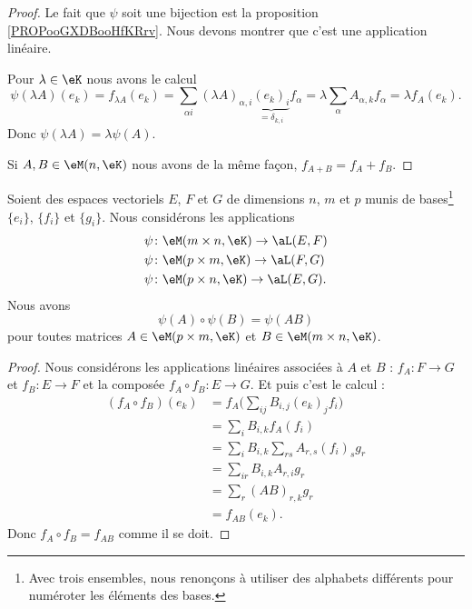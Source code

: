 \begin{proof}
	Le fait que \( \psi\) soit une bijection est la proposition \ref{PROPooGXDBooHfKRrv}. Nous devons montrer que c'est une application linéaire.

	Pour \( \lambda\in \eK\) nous avons le calcul
	\begin{equation}
		\psi(\lambda A)(e_k)=f_{\lambda A}(e_k)=\sum_{\alpha i}(\lambda A)_{\alpha, i}\underbrace{(e_k)_i}_{=\delta_{k,i}}f_{\alpha}=\lambda\sum_{\alpha}A_{\alpha, k}f_{\alpha}=\lambda f_A(e_k).
	\end{equation}
	Donc \( \psi(\lambda A)=\lambda\psi(A)\).

	Si \( A,B\in \eM(n,\eK)\) nous avons de la même façon, \( f_{A+B}=f_A+f_B\).
\end{proof}

\begin{proposition}     \label{PROPooCSJNooEqcmFm}
	Soient des espaces vectoriels \( E\), \( F\) et \( G\) de dimensions \( n\), \( m\) et \( p\) munis de bases\footnote{Avec trois ensembles, nous renonçons à utiliser des alphabets différents pour numéroter les éléments des bases.} \( \{ e_i \}\), \( \{ f_i \}\) et \( \{ g_i \}\). Nous considérons les applications
	\begin{subequations}
		\begin{align}
			\psi & \colon \eM(m\times n,\eK)\to \aL(E,F)  \\
			\psi & \colon \eM(p\times m,\eK)\to \aL(F,G)  \\
			\psi & \colon \eM(p\times n,\eK)\to \aL(E,G).
		\end{align}
	\end{subequations}
	Nous avons
	\begin{equation}
		\psi(A)\circ \psi(B)=\psi(AB)
	\end{equation}
	pour toutes matrices \( A\in \eM(p\times m,\eK)\) et \( B\in \eM(m\times n,\eK)\).
\end{proposition}

\begin{proof}
	Nous considérons les applications linéaires associées à \( A\) et \( B\) : \( f_A\colon F\to G\) et \( f_B\colon E\to F\) et la composée \( f_A\circ f_B\colon E\to G\). Et puis c'est le calcul :
	\begin{subequations}
		\begin{align}
			(f_A\circ f_B)(e_k) & =f_A\big( \sum_{ij}B_{i,j}(e_k)_j f_i \big) \\
			                    & =\sum_i B_{i,k}f_A(f_i)                     \\
			                    & =\sum_iB_{i,k}\sum_{rs}A_{r,s}(f_i)_s g_r   \\
			                    & =\sum_{ir}B_{i,k}A_{r,i} g_r                \\
			                    & =\sum_r(AB)_{r,k} g_r                       \\
			                    & =f_{AB}(e_k).
		\end{align}
	\end{subequations}
	Donc \( f_A\circ f_B=f_{AB}\) comme il se doit.
\end{proof}

